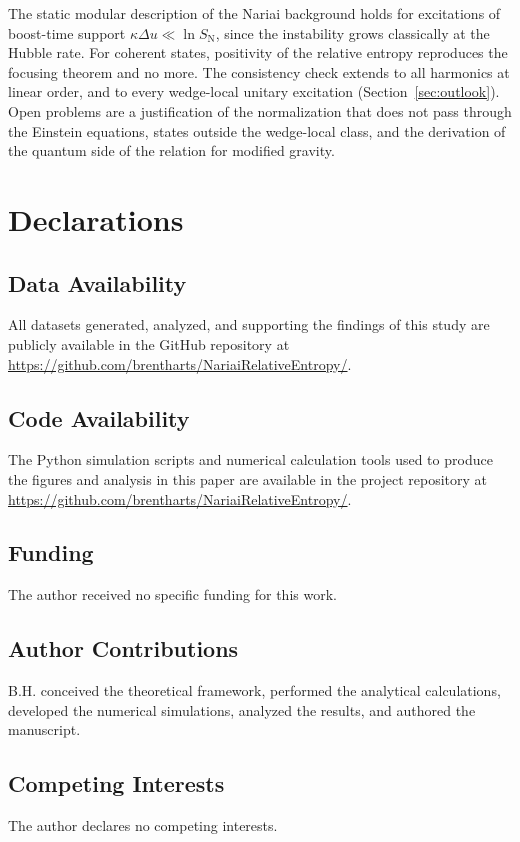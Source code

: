 \documentclass[11pt]{article}
\begin{document}
The static modular description of the Nariai background holds for excitations of boost-time support $\kappa\Delta u\ll\ln S_{\mathrm N}$, since the instability grows classically at the Hubble rate. For coherent states, positivity of the relative entropy reproduces the focusing theorem and no more. The consistency check extends to all harmonics at linear order, and to every wedge-local unitary excitation (Section~\ref{sec:outlook}). Open problems are a justification of the normalization that does not pass through the Einstein equations, states outside the wedge-local class, and the derivation of the quantum side of the relation for modified gravity.

\section*{Declarations}

\subsection*{Data Availability}
All datasets generated, analyzed, and supporting the findings of this study are publicly available in the GitHub repository at \url{https://github.com/brentharts/NariaiRelativeEntropy/}.

\subsection*{Code Availability}
The Python simulation scripts and numerical calculation tools used to produce the figures and analysis in this paper are available in the project repository at \url{https://github.com/brentharts/NariaiRelativeEntropy/}.

\subsection*{Funding}
The author received no specific funding for this work.

\subsection*{Author Contributions}
B.H. conceived the theoretical framework, performed the analytical calculations, developed the numerical simulations, analyzed the results, and authored the manuscript.

\subsection*{Competing Interests}
The author declares no competing interests.
\end{document}
